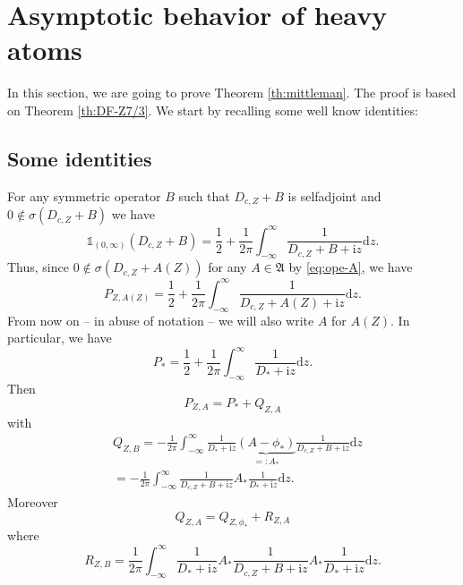 \documentclass[a4paper]{amsart}
\def\1{{\mathds{1}}}
\def\gA{\mathfrak{A}}
\def\rd{\mathrm{d}}
\def\ri{\mathrm{i}}
\begin{document}
\section{Asymptotic behavior of heavy atoms}\label{sec:asymptotic}
In this section, we are going to prove Theorem \ref{th:mittleman}. The
proof is based on Theorem \ref{th:DF-Z7/3}. We start by recalling some
well know identities:

\subsection{Some identities}

For any symmetric operator $B$ such that $D_{c,Z}+B$ is selfadjoint
and $0\not\in \sigma(D_{c,Z}+B)$ we have
\begin{equation}\label{eq:projector}
  \1_{(0,\infty)}(D_{c,Z}+B)=\frac{1}{2}+\frac{1}{2\pi}\int_{-\infty}^{\infty} \frac{1}{D_{c,Z}+B+\ri z}\rd z.
\end{equation}
Thus, since $0\not\in \sigma(D_{c,Z}+{A(Z)})$ for any $A\in \gA$ by
\eqref{eq:ope-A}, we have
\begin{equation}
P_{Z,A(Z)}= \frac{1}{2}+\frac{1}{2\pi}\int_{-\infty}^{\infty} \frac{1}{D_{c,Z}+A(Z)+\ri z}\rd z.
\end{equation}
From now on -- in abuse of notation -- we will also write $A$ for
$A(Z)$.  In particular, we have
\begin{equation}
    P_*= \frac{1}{2}+\frac{1}{2\pi}\int_{-\infty}^{\infty} \frac{1}{D_*+\ri z}\rd z.
\end{equation}
Then
\begin{equation}\label{eq:PA-P1A} P_{Z,A}=P_*+ Q_{Z,A} \end{equation}
with
\begin{equation}
  \begin{split}
    &Q_{Z,B}=-\frac{1}{2\pi} \int_{-\infty}^{\infty} \frac{1}{D_*+\ri z}\underbrace{(A- \phi_*)}_{=:A_*} \frac{1}{D_{c,Z}+B+\ri z}\rd z\\
    &=-\frac{1}{2\pi} \int_{-\infty}^{\infty} \frac{1}{D_{c,Z}+B+\ri z} A_*\frac{1}{D_*+\ri z}\rd z. 
  \end{split}
\end{equation}
Moreover
\begin{equation}\label{eq:P1A-P2A}
    Q_{Z,A}= Q_{Z,\phi_*}+ R_{Z,A}
\end{equation}
where
\begin{equation}
    R_{Z,B}=\frac{1}{2\pi}\int_{-\infty}^{\infty}\frac{1}{D_*+\ri z}A_*\frac{1}{D_{c,Z}+B+\ri z}A_*\frac{1}{D_*+\ri z} \rd z.
\end{equation}
\end{document}

